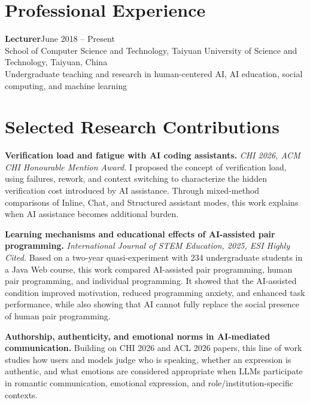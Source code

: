 \documentclass[a4paper,10pt]{article}
\newcommand{\cvlabel}[1]{\textbf{#1}}
\newcommand{\entry}[4]{\textbf{#1}\hfill #2\\#3\\\textcolor{cvgray}{#4}\vspace{0.15em}}
\begin{document}
\section*{Professional Experience}

\entry{Lecturer}{June 2018 -- Present}{School of Computer Science and Technology, Taiyuan University of Science and Technology, Taiyuan, China}{Undergraduate teaching and research in human-centered AI, AI education, social computing, and machine learning}

\section*{Selected Research Contributions}
\begin{enumerate}[label=\textbf{[S\arabic*]}]
  \item \cvlabel{Verification load and fatigue with AI coding assistants.} \textit{CHI 2026, ACM CHI Honourable Mention Award.} I proposed the concept of verification load, using failures, rework, and context switching to characterize the hidden verification cost introduced by AI assistance. Through mixed-method comparisons of Inline, Chat, and Structured assistant modes, this work explains when AI assistance becomes additional burden.

  \item \cvlabel{Learning mechanisms and educational effects of AI-assisted pair programming.} \textit{International Journal of STEM Education, 2025, ESI Highly Cited.} Based on a two-year quasi-experiment with 234 undergraduate students in a Java Web course, this work compared AI-assisted pair programming, human pair programming, and individual programming. It showed that the AI-assisted condition improved motivation, reduced programming anxiety, and enhanced task performance, while also showing that AI cannot fully replace the social presence of human pair programming.

  \item \cvlabel{Authorship, authenticity, and emotional norms in AI-mediated communication.} Building on CHI 2026 and ACL 2026 papers, this line of work studies how users and models judge who is speaking, whether an expression is authentic, and what emotions are considered appropriate when LLMs participate in romantic communication, emotional expression, and role/institution-specific contexts.


\end{enumerate}
\end{document}
